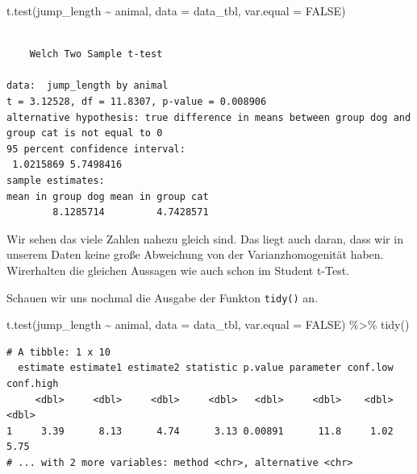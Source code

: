 \documentclass[
  letterpaper,
  DIV=11,
  oneside]{scrreport}
\newenvironment{Shaded}{\begin{snugshade}}{\end{snugshade}}
\newcommand{\AttributeTok}[1]{\textcolor[rgb]{0.40,0.45,0.13}{#1}}
\newcommand{\ConstantTok}[1]{\textcolor[rgb]{0.56,0.35,0.01}{#1}}
\newcommand{\FunctionTok}[1]{\textcolor[rgb]{0.28,0.35,0.67}{#1}}
\newcommand{\NormalTok}[1]{\textcolor[rgb]{0.00,0.23,0.31}{#1}}
\newcommand{\SpecialCharTok}[1]{\textcolor[rgb]{0.37,0.37,0.37}{#1}}
\begin{document}
\begin{Shaded}
\begin{Highlighting}[]
\FunctionTok{t.test}\NormalTok{(jump\_length }\SpecialCharTok{\textasciitilde{}}\NormalTok{ animal, }
       \AttributeTok{data =}\NormalTok{ data\_tbl, }\AttributeTok{var.equal =} \ConstantTok{FALSE}\NormalTok{)}
\end{Highlighting}
\end{Shaded}

\begin{verbatim}

    Welch Two Sample t-test

data:  jump_length by animal
t = 3.12528, df = 11.8307, p-value = 0.008906
alternative hypothesis: true difference in means between group dog and group cat is not equal to 0
95 percent confidence interval:
 1.0215869 5.7498416
sample estimates:
mean in group dog mean in group cat 
        8.1285714         4.7428571 
\end{verbatim}

Wir sehen das viele Zahlen nahezu gleich sind. Das liegt auch daran,
dass wir in unserem Daten keine große Abweichung von der
Varianzhomogenität haben. Wirerhalten die gleichen Aussagen wie auch
schon im Student t-Test.

Schauen wir uns nochmal die Ausgabe der Funkton \texttt{tidy()} an.

\begin{Shaded}
\begin{Highlighting}[]
\FunctionTok{t.test}\NormalTok{(jump\_length }\SpecialCharTok{\textasciitilde{}}\NormalTok{ animal, }
       \AttributeTok{data =}\NormalTok{ data\_tbl, }\AttributeTok{var.equal =} \ConstantTok{FALSE}\NormalTok{) }\SpecialCharTok{\%\textgreater{}\%} 
  \FunctionTok{tidy}\NormalTok{() }
\end{Highlighting}
\end{Shaded}

\begin{verbatim}
# A tibble: 1 x 10
  estimate estimate1 estimate2 statistic p.value parameter conf.low conf.high
     <dbl>     <dbl>     <dbl>     <dbl>   <dbl>     <dbl>    <dbl>     <dbl>
1     3.39      8.13      4.74      3.13 0.00891      11.8     1.02      5.75
# ... with 2 more variables: method <chr>, alternative <chr>
\end{verbatim}

{}
\end{document}
